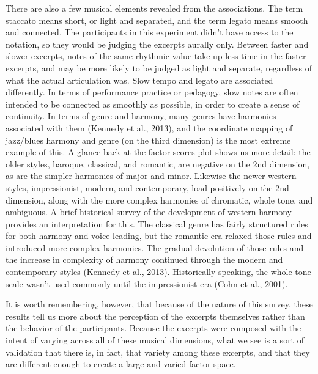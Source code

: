 \documentclass[
  english,
  man,floatsintext]{apa6}
\begin{document}
There are also a few musical elements revealed from the associations. The term staccato means short, or light and separated, and the term legato means smooth and connected. The participants in this experiment didn't have access to the notation, so they would be judging the excerpts aurally only. Between faster and slower excerpts, notes of the same rhythmic value take up less time in the faster excerpts, and may be more likely to be judged as light and separate, regardless of what the actual articulation was. Slow tempo and legato are associated differently. In terms of performance practice or pedagogy, slow notes are often intended to be connected as smoothly as possible, in order to create a sense of continuity. In terms of genre and harmony, many genres have harmonies associated with them (Kennedy et al., 2013), and the coordinate mapping of jazz/blues harmony and genre (on the third dimension) is the most extreme example of this. A glance back at the factor scores plot shows us more detail: the older styles, baroque, classical, and romantic, are negative on the 2nd dimension, as are the simpler harmonies of major and minor. Likewise the newer western styles, impressionist, modern, and contemporary, load positively on the 2nd dimension, along with the more complex harmonies of chromatic, whole tone, and ambiguous. A brief historical survey of the development of western harmony provides an interpretation for this. The classical genre has fairly structured rules for both harmony and voice leading, but the romantic era relaxed those rules and introduced more complex harmonies. The gradual devolution of those rules and the increase in complexity of harmony continued through the modern and contemporary styles (Kennedy et al., 2013). Historically speaking, the whole tone scale wasn't used commonly until the impressionist era (Cohn et al., 2001).

It is worth remembering, however, that because of the nature of this survey, these results tell us more about the perception of the excerpts themselves rather than the behavior of the participants. Because the excerpts were composed with the intent of varying across all of these musical dimensions, what we see is a sort of validation that there is, in fact, that variety among these excerpts, and that they are different enough to create a large and varied factor space.
\end{document}
